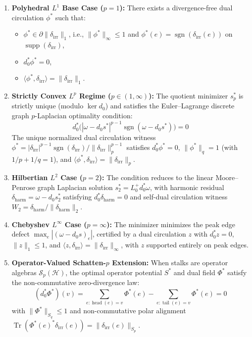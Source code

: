 \documentclass[
]{article}
\providecommand{\tightlist}{%
  \setlength{\itemsep}{0pt}\setlength{\parskip}{0pt}}
\providecommand{\tightlist}{%
  \setlength{\itemsep}{0pt}\setlength{\parskip}{0pt}}
\begin{document}
\begin{enumerate}
\def\labelenumi{\arabic{enumi}.}
\item
  \textbf{Polyhedral \(L^1\) Base Case (\(p = 1\)):} There exists a divergence-free dual circulation \(\phi^*\) such that:

  \begin{itemize}
  \tightlist
  \item
    \(\phi^* \in \partial \|\delta_{\mathrm{irr}}\|_1\), i.e., \(\|\phi^*\|_\infty \le 1\) and \(\phi^*(e) = \operatorname{sgn}(\delta_{\mathrm{irr}}(e))\) on \(\operatorname{supp}(\delta_{\mathrm{irr}})\),
  \item
    \(d_0^* \phi^* = 0\),
  \item
    \(\langle \phi^*, \delta_{\mathrm{irr}} \rangle = \|\delta_{\mathrm{irr}}\|_1\).
  \end{itemize}
\item
  \textbf{Strictly Convex \(L^p\) Regime (\(p \in (1, \infty)\)):} The quotient minimizer \(s_p^*\) is strictly unique (modulo \(\ker d_0\)) and satisfies the Euler--Lagrange discrete graph \(p\)-Laplacian optimality condition:
  \[ d_0^* \Big( |\omega - d_0 s^*|^{p-1} \operatorname{sgn}(\omega - d_0 s^*) \Big) = 0 \]
  The unique normalized dual circulation witness \(\phi^* = |\delta_{\mathrm{irr}}|^{p-1} \operatorname{sgn}(\delta_{\mathrm{irr}}) / \|\delta_{\mathrm{irr}}\|_p^{p-1}\) satisfies \(d_0^* \phi^* = 0\), \(\|\phi^*\|_q = 1\) (with \(1/p + 1/q = 1\)), and \(\langle \phi^*, \delta_{\mathrm{irr}} \rangle = \|\delta_{\mathrm{irr}}\|_p\).
\item
  \textbf{Hilbertian \(L^2\) Case (\(p = 2\)):} The condition reduces to the linear Moore--Penrose graph Laplacian solution \(s_2^* = L_0^+ d_0^* \omega\), with harmonic residual \(\delta_{\mathrm{harm}} = \omega - d_0 s_2^*\) satisfying \(d_0^* \delta_{\mathrm{harm}} = 0\) and self-dual circulation witness \(W_2 = \delta_{\mathrm{harm}} / \|\delta_{\mathrm{harm}}\|_2\).
\item
  \textbf{Chebyshev \(L^\infty\) Case (\(p = \infty\)):} The minimizer minimizes the peak edge defect \(\max_e |(\omega - d_0 s)_e|\), certified by a dual circulation \(z\) with \(d_0^* z = 0\), \(\|z\|_1 \le 1\), and \(\langle z, \delta_{\mathrm{irr}} \rangle = \|\delta_{\mathrm{irr}}\|_\infty\), with \(z\) supported entirely on peak edges.
\item
  \textbf{Operator-Valued Schatten-\(p\) Extension:} When stalks are operator algebras \(\mathcal{S}_p(\mathcal{H})\), the optimal operator potential \(S^*\) and dual field \(\Phi^*\) satisfy the non-commutative zero-divergence law:
  \[ (d_0^* \Phi^*)(v) = \sum_{e: \operatorname{head}(e)=v} \Phi^*(e) - \sum_{e: \operatorname{tail}(e)=v} \Phi^*(e) = 0 \]
  with \(\|\Phi^*\|_{S_q} \le 1\) and non-commutative polar alignment \(\operatorname{Tr}(\Phi^*(e)^* \delta_{\mathrm{irr}}(e)) = \|\delta_{\mathrm{irr}}(e)\|_{S_p}\).
\end{enumerate}
\end{document}
